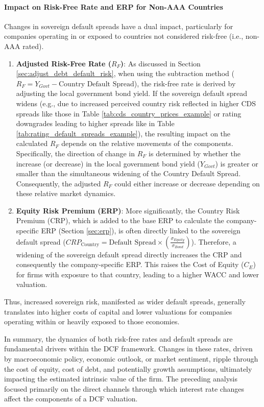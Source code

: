 \paragraph{Impact on Risk-Free Rate and ERP for Non-AAA Countries}
Changes in sovereign default spreads have a dual impact, particularly for companies operating in or exposed to countries not considered risk-free (i.e., non-AAA rated).
\begin{enumerate}
    \item \textbf{Adjusted Risk-Free Rate (\(R_F\))}: As discussed in Section \ref{sec:adjust_debt_default_risk}, when using the subtraction method (\(R_F = Y_{Govt} - \text{Country Default Spread}\)), the risk-free rate is derived by adjusting the local government bond yield. If the sovereign default spread widens (e.g., due to increased perceived country risk reflected in higher CDS spreads like those in Table \ref{tab:cds_country_prices_example} or rating downgrades leading to higher spreads like in Table \ref{tab:rating_default_spreads_example}), the resulting impact on the calculated \(R_F\) depends on the relative movements of the components. Specifically, the direction of change in \(R_F\) is determined by whether the increase (or decrease) in the local government bond yield (\(Y_{Govt}\)) is greater or smaller than the simultaneous widening of the Country Default Spread. Consequently, the adjusted \(R_F\) could either increase or decrease depending on these relative market dynamics.
    \item \textbf{Equity Risk Premium (ERP)}: More significantly, the Country Risk Premium (CRP), which is added to the base ERP to calculate the company-specific ERP (Section \ref{sec:erp}), is often directly linked to the sovereign default spread (\(CRP_{\text{Country}} = \text{Default Spread} \times (\frac{\sigma_{Equity}}{\sigma_{Bond}})\)). Therefore, a widening of the sovereign default spread directly increases the CRP and consequently the company-specific ERP. This raises the Cost of Equity (\(C_E\)) for firms with exposure to that country, leading to a higher WACC and lower valuation.
\end{enumerate}
Thus, increased sovereign risk, manifested as wider default spreads, generally translates into higher costs of capital and lower valuations for companies operating within or heavily exposed to those economies.

In summary, the dynamics of both risk-free rates and default spreads are fundamental drivers within the DCF framework. Changes in these rates, driven by macroeconomic policy, economic outlook, or market sentiment, ripple through the cost of equity, cost of debt, and potentially growth assumptions, ultimately impacting the estimated intrinsic value of the firm. The preceding analysis focused primarily on the direct channels through which interest rate changes affect the components of a DCF valuation.

